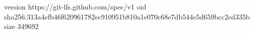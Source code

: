 version https://git-lfs.github.com/spec/v1
oid sha256:313a4efb46f620961782ec910951b810a1e070c68e7db544e5d659bcc2ed335b
size 349692
